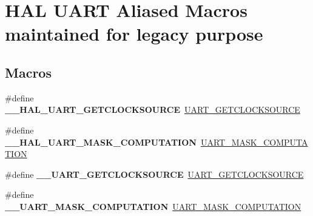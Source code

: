\hypertarget{group___h_a_l___u_a_r_t___aliased___macros}{}\section{H\+AL U\+A\+RT Aliased Macros maintained for legacy purpose}
\label{group___h_a_l___u_a_r_t___aliased___macros}
\subsection*{Macros}
\begin{DoxyCompactItemize}
\item 
\mbox{\label{group___h_a_l___u_a_r_t___aliased___macros_ga42daa2078cec8482c126dd059211feea}} 
\#define {\bfseries \+\_\+\+\_\+\+H\+A\+L\+\_\+\+U\+A\+R\+T\+\_\+\+G\+E\+T\+C\+L\+O\+C\+K\+S\+O\+U\+R\+CE}~\mbox{\hyperlink{group___u_a_r_t_ex___private___macros_ga2d8ffd4cb12754846ace609dff92e8df}{U\+A\+R\+T\+\_\+\+G\+E\+T\+C\+L\+O\+C\+K\+S\+O\+U\+R\+CE}}
\item 
\mbox{\label{group___h_a_l___u_a_r_t___aliased___macros_gaf30b26158e4eaa99871067016049156d}} 
\#define {\bfseries \+\_\+\+\_\+\+H\+A\+L\+\_\+\+U\+A\+R\+T\+\_\+\+M\+A\+S\+K\+\_\+\+C\+O\+M\+P\+U\+T\+A\+T\+I\+ON}~\mbox{\hyperlink{group___u_a_r_t_ex___private___macros_gad9330184a8bd9399a36bcc93215a50d1}{U\+A\+R\+T\+\_\+\+M\+A\+S\+K\+\_\+\+C\+O\+M\+P\+U\+T\+A\+T\+I\+ON}}
\item 
\mbox{\label{group___h_a_l___u_a_r_t___aliased___macros_ga62b39e2261e76db74c78d6dbdb677937}} 
\#define {\bfseries \+\_\+\+\_\+\+U\+A\+R\+T\+\_\+\+G\+E\+T\+C\+L\+O\+C\+K\+S\+O\+U\+R\+CE}~\mbox{\hyperlink{group___u_a_r_t_ex___private___macros_ga2d8ffd4cb12754846ace609dff92e8df}{U\+A\+R\+T\+\_\+\+G\+E\+T\+C\+L\+O\+C\+K\+S\+O\+U\+R\+CE}}
\item 
\mbox{\label{group___h_a_l___u_a_r_t___aliased___macros_ga4361b9637b14e21ac5a32f8d298bd270}} 
\#define {\bfseries \+\_\+\+\_\+\+U\+A\+R\+T\+\_\+\+M\+A\+S\+K\+\_\+\+C\+O\+M\+P\+U\+T\+A\+T\+I\+ON}~\mbox{\hyperlink{group___u_a_r_t_ex___private___macros_gad9330184a8bd9399a36bcc93215a50d1}{U\+A\+R\+T\+\_\+\+M\+A\+S\+K\+\_\+\+C\+O\+M\+P\+U\+T\+A\+T\+I\+ON}}

\end{DoxyCompactItemize}
